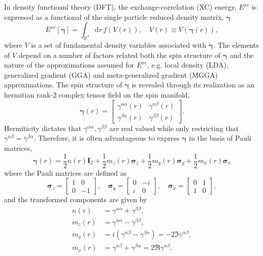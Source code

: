 \documentclass[11pt]{article}
\newcommand{\opdm}[0]{\boldsymbol{\gamma}}
\newcommand{\pauli}[1]{\boldsymbol{\sigma}_{#1}}
\newcommand{\dd}[1]{\mathrm{d}{#1}\,}
\begin{document}
In density functioanl theory (DFT), the exchange-correlation (XC) energy, 
$E^{xc}$ is expressed as a functional of the single particle reduced density 
matrix, $\opdm$
\begin{equation}
E^{xc}[\opdm] = \int_{\mathbb{R}^3} \dd{r} f( V(r) ), \quad V(r) \equiv V(\opdm(r)),
\end{equation}
where $V$ is a set of fundamental density variables associated with
$\opdm$. The elements of $V$ depend on a number of factors related both
the spin structure of $\opdm$ and the nature of the approximations assumed
for $E^{xc}$, e.g. local density (LDA), generalized gradient (GGA) and 
meta-generalized gradient (MGGA) approximations. 
The spin structure of $\opdm$ is revealed through its realization as an hermitian rank-2 
complex tensor field on the spin manifold,
\begin{equation}
\opdm(r) = \begin{bmatrix} 
  \gamma^{\alpha\alpha}(r) & \gamma^{\alpha\beta}(r) \\ 
  \gamma^{\beta\alpha}(r) & \gamma^{\beta\beta}(r) 
\end{bmatrix}.
\end{equation}
Hermiticity dictates that $\gamma^{\alpha\alpha}, \gamma^{\beta\beta}$ are real valued while
only restricting that $\gamma^{\alpha\beta} = \bar{\gamma}^{\beta\alpha}$. Therefore, it is
often advantageous to express $\opdm$ in the basis of Pauli matrices, 
\begin{equation}
\opdm(r) = \frac{1}{2}n(r) \mathbf{I}_2 + \frac{1}{2}m_z(r) \pauli{z}
  + \frac{1}{2}m_y(r) \pauli{y}
  + \frac{1}{2}m_x(r) \pauli{x}
\end{equation}
where the Pauli matrices are defined as 
\begin{equation}
\pauli{z} = \begin{bmatrix} 1 & 0 \\ 0 & -1 \end{bmatrix},\quad
\pauli{y} = \begin{bmatrix} 0 & -i \\ i & 0 \end{bmatrix},\quad
\pauli{x} = \begin{bmatrix} 0 & 1  \\ 1 & 0 \end{bmatrix},
\end{equation}
and the transformed components are given by
\begin{align}
n(r)   &= \gamma^{\alpha\alpha} + \gamma^{\beta\beta},    \\ 
m_z(r) &= \gamma^{\alpha\alpha} - \gamma^{\beta\beta},    \\
m_y(r) &= i(\gamma^{\alpha\beta} - \gamma^{\beta\alpha}) = -2\Im \gamma^{\alpha\beta}, \\
m_x(r) &= \gamma^{\alpha\beta} + \gamma^{\beta\alpha}    = 2\Re \gamma^{\alpha\beta}.
\end{align}
\end{document}
